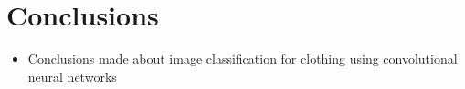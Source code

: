 \documentclass[12pt]{article} %
\begin{document}
\section{Conclusions}
\begin{itemize}
\item Conclusions made about image classification for clothing using convolutional neural networks
\end{itemize}





\end{document}
